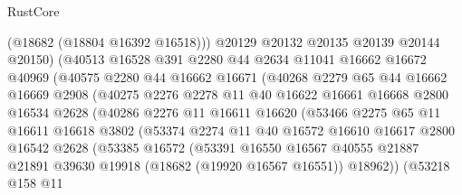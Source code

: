 \begin{lexlean}{RustCore}
\begin{coremodule}
                      (@18682 (@18804 @16392 @16518)))
                    @20129
                    @20132
                    @20135
                    @20139
                    @20144
                    @20150)
                  (@40513
                    @16528
                    @391
                    @2280
                    @44
                    @2634
                    @11041
                    @16662
                    @16672
                    @40969
                    (@40575
                      @2280
                      @44
                      @16662
                      @16671
                      (@40268
                        @2279
                        @65
                        @44
                        @16662
                        @16669
                        @2908
                        (@40275
                          @2276
                          @2278
                          @11
                          @40
                          @16622
                          @16661
                          @16668
                          @2800
                          @16534
                          @2628
                          (@40286
                            @2276
                            @11
                            @16611
                            @16620
                            (@53466
                              @2275
                              @65
                              @11
                              @16611
                              @16618
                              @3802
                              (@53374
                                @2274
                                @11
                                @40
                                @16572
                                @16610
                                @16617
                                @2800
                                @16542
                                @2628
                                (@53385
                                  @16572
                                  (@53391
                                    @16550
                                    @16567
                                    @40555
                                    @21887
                                    @21891
                                    @39630
                                    @19918
                                    (@18682 (@19920 @16567 @16551))
                                    @18962))
                                (@53218
                                  @158
                                  @11

\end{coremodule}
\end{lexlean}
